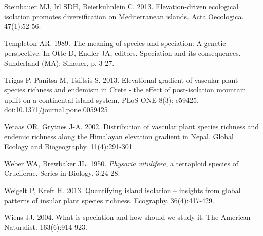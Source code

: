 Steinbauer MJ, Irl SDH, Beierkuhnlein C. 2013. Elevation-driven ecological isolation promotes diversification on Mediterranean islands. Acta Oecologica. 47(1):52-56.

Templeton AR. 1989. The meaning of species and speciation: A genetic perspective. In Otte D, Endler JA, editors. Speciation and its consequences. Sunderland (MA): Sinauer, p. 3-27.

Trigas P, Panitsa M, Tsiftsis S. 2013. Elevational gradient of vascular plant species richness and endemism in Crete - the effect of post-isolation mountain uplift on a continental island system. PLoS ONE 8(3): e59425. doi:10.1371/journal.pone.0059425

Vetaas OR, Grytnes J-A. 2002. Distribution of vascular plant species richness and endemic richness along the Himalayan elevation gradient in Nepal. Global Ecology and Biogeography. 11(4):291-301.

Weber WA, Brewbaker JL. 1950. \textit{Physaria vitulifera}, a tetraploid species of Cruciferae. Series in Biology. 3:24-28.

Weigelt P, Kreft H. 2013. Quantifying island isolation – insights from global patterns of insular plant species richness. Ecography. 36(4):417-429.

Wiens JJ. 2004. What is speciation and how should we study it. The American Naturalist. 163(6):914-923.

\setlength{\parindent}{0em}
\setlength{\leftskip}{0em}
\setlength{\parskip}{6pt}
\doublespacing

